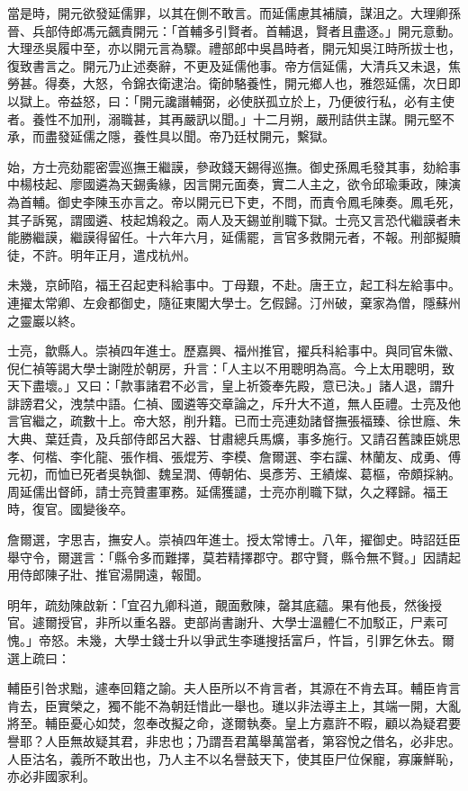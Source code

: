 \begin{pinyinscope}
當是時，開元欲發延儒罪，以其在側不敢言。而延儒慮其補牘，謀沮之。大理卿孫晉、兵部侍郎馮元飆責開元：「首輔多引賢者。首輔退，賢者且盡逐。」開元意動。大理丞吳履中至，亦以開元言為驟。禮部郎中吳昌時者，開元知吳江時所拔士也，復致書言之。開元乃止述奏辭，不更及延儒他事。帝方信延儒，大清兵又未退，焦勞甚。得奏，大怒，令錦衣衛逮治。衛帥駱養性，開元鄉人也，雅怨延儒，次日即以獄上。帝益怒，曰：「開元讒譖輔弼，必使朕孤立於上，乃便彼行私，必有主使者。養性不加刑，溺職甚，其再嚴訊以聞。」十二月朔，嚴刑詰供主謀。開元堅不承，而盡發延儒之隱，養性具以聞。帝乃廷杖開元，繫獄。

始，方士亮劾罷密雲巡撫王繼謨，參政錢天錫得巡撫。御史孫鳳毛發其事，劾給事中楊枝起、廖國遴為天錫夤緣，因言開元面奏，實二人主之，欲令邱瑜秉政，陳演為首輔。御史李陳玉亦言之。帝以開元已下吏，不問，而責令鳳毛陳奏。鳳毛死，其子訴冤，謂國遴、枝起鴆殺之。兩人及天錫並削職下獄。士亮又言恐代繼謨者未能勝繼謨，繼謨得留任。十六年六月，延儒罷，言官多救開元者，不報。刑部擬贖徒，不許。明年正月，遣戍杭州。

未幾，京師陷，福王召起吏科給事中。丁母艱，不赴。唐王立，起工科左給事中。連擢太常卿、左僉都御史，隨征東閣大學士。乞假歸。汀州破，棄家為僧，隱蘇州之靈巖以終。

士亮，歙縣人。崇禎四年進士。歷嘉興、福州推官，擢兵科給事中。與同官朱徽、倪仁禎等謁大學士謝陞於朝房，升言：「人主以不用聰明為高。今上太用聰明，致天下盡壞。」又曰：「款事諸君不必言，皇上祈簽奉先殿，意已決。」諸人退，謂升誹謗君父，洩禁中語。仁禎、國遴等交章論之，斥升大不道，無人臣禮。士亮及他言官繼之，疏數十上。帝大怒，削升籍。已而士亮連劾諸督撫張福臻、徐世廕、朱大典、葉廷貴，及兵部侍郎呂大器、甘肅總兵馬爌，事多施行。又請召舊諫臣姚思孝、何楷、李化龍、張作楫、張焜芳、李模、詹爾選、李右讜、林蘭友、成勇、傅元初，而恤已死者吳執御、魏呈潤、傅朝佑、吳彥芳、王績燦、葛樞，帝頗採納。周延儒出督師，請士亮贊畫軍務。延儒獲譴，士亮亦削職下獄，久之釋歸。福王時，復官。國變後卒。

詹爾選，字思吉，撫安人。崇禎四年進士。授太常博士。八年，擢御史。時詔廷臣舉守令，爾選言：「縣令多而難擇，莫若精擇郡守。郡守賢，縣令無不賢。」因請起用侍郎陳子壯、推官湯開遠，報聞。

明年，疏劾陳啟新：「宜召九卿科道，覿面敷陳，罄其底蘊。果有他長，然後授官。遽爾授官，非所以重名器。吏部尚書謝升、大學士溫體仁不加駁正，尸素可愧。」帝怒。未幾，大學士錢士升以爭武生李璡搜括富戶，忤旨，引罪乞休去。爾選上疏曰：

輔臣引咎求黜，遽奉回籍之諭。夫人臣所以不肯言者，其源在不肯去耳。輔臣肯言肯去，臣實榮之，獨不能不為朝廷惜此一舉也。璡以非法導主上，其端一開，大亂將至。輔臣憂心如焚，忽奉改擬之命，遂爾執奏。皇上方嘉許不暇，顧以為疑君要譽耶？人臣無故疑其君，非忠也；乃謂吾君萬舉萬當者，第容悅之借名，必非忠。人臣沽名，義所不敢出也，乃人主不以名譽鼓天下，使其臣尸位保寵，寡廉鮮恥，亦必非國家利。


\end{pinyinscope}

